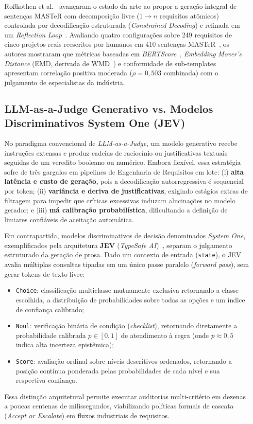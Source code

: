 Ro\ss kothen et al.~\cite{rosskothen2026converting} avançaram o estado da arte ao propor a geração integral de sentenças MASTeR com decomposição livre ($1 \rightarrow n$ requisitos atômicos) controlada por decodificação estruturada (\textit{Constrained Decoding}) e refinada em um \textit{Reflection Loop}~\cite{ji2023mitigating}. Avaliando quatro configurações sobre 249 requisitos de cinco projetos reais reescritos por humanos em 410 sentenças MASTeR~\cite{grosser2023comparative}, os autores mostraram que métricas baseadas em \textit{BERTScore}~\cite{zhang2020bertscore}, \textit{Embedding Mover's Distance} (EMD, derivada de WMD~\cite{kusner2015word}) e conformidade de sub-templates apresentam correlação positiva moderada ($\rho = 0{,}503$ combinada) com o julgamento de especialistas da indústria.

\subsection{LLM-as-a-Judge Generativo vs. Modelos Discriminativos System One (JEV)}
No paradigma convencional de \textit{LLM-as-a-Judge}, um modelo generativo recebe instruções extensas e produz cadeias de raciocínio ou justificativas textuais seguidas de um veredito booleano ou numérico. Embora flexível, essa estratégia sofre de três gargalos em pipelines de Engenharia de Requisitos em lote: (i) \textbf{alta latência e custo de geração}, pois a decodificação autorregressiva é sequencial por token; (ii) \textbf{variância e deriva de justificativas}, exigindo estágios extras de filtragem para impedir que críticas excessivas induzam alucinações no modelo gerador; e (iii) \textbf{má calibração probabilística}, dificultando a definição de limiares confiáveis de aceitação automática.

Em contrapartida, modelos discriminativos de decisão denominados \textit{System One}, exemplificados pela arquitetura \textbf{JEV} (\textit{TypeSafe AI})~\cite{typesafe2026jev}, separam o julgamento estruturado da geração de prosa. Dado um contexto de entrada (\texttt{state}), o JEV avalia múltiplas consultas tipadas em um único passe paralelo (\textit{forward pass}), sem gerar tokens de texto livre:
\begin{itemize}
    \item \texttt{Choice}: classificação multiclasse mutuamente exclusiva retornando a classe escolhida, a distribuição de probabilidades sobre todas as opções e um índice de confiança calibrado;
    \item \texttt{Noul}: verificação binária de condição (\textit{checklist}), retornando diretamente a probabilidade calibrada $p \in [0, 1]$ de atendimento à regra (onde $p \approx 0{,}5$ indica alta incerteza epistêmica);
    \item \texttt{Score}: avaliação ordinal sobre níveis descritivos ordenados, retornando a posição contínua ponderada pelas probabilidades de cada nível e sua respectiva confiança.
\end{itemize}
Essa distinção arquitetural permite executar auditorias multi-critério em dezenas a poucas centenas de milissegundos, viabilizando políticas formais de cascata (\textit{Accept or Escalate}) em fluxos industriais de requisitos.

